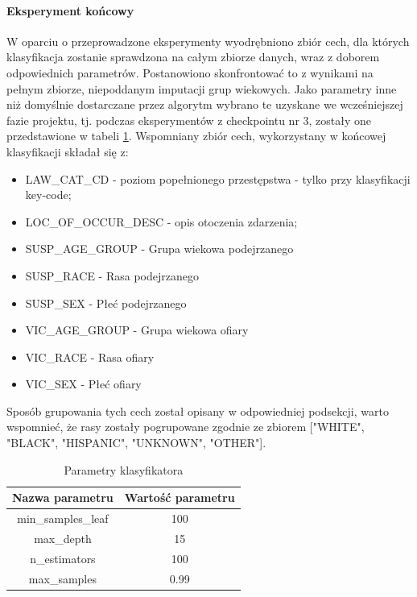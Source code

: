\documentclass{classrep}
\begin{document}
{{{                \paragraph{Eksperyment końcowy} {
                    W oparciu o przeprowadzone eksperymenty wyodrębniono zbiór cech, dla których klasyfikacja zostanie sprawdzona na całym zbiorze danych, wraz z doborem odpowiednich parametrów. Postanowiono skonfrontować to z wynikami na pełnym zbiorze, niepoddanym imputacji grup wiekowych. Jako parametry inne niż domyślnie dostarczane przez algorytm wybrano te uzyskane we wcześniejszej fazie projektu, tj. podczas eksperymentów z checkpointu nr 3, zostały one przedstawione w tabeli \ref{goal_1_exp_final_params}.
                    Wspomniany zbiór cech, wykorzystany w końcowej klasyfikacji składał się z: 
                    \begin{itemize}
                        \item LAW\_CAT\_CD - poziom popełnionego przestępstwa - tylko przy klasyfikacji key-code;
                        \item LOC\_OF\_OCCUR\_DESC - opis otoczenia zdarzenia;
                        \item SUSP\_AGE\_GROUP - Grupa wiekowa podejrzanego
                        \item SUSP\_RACE - Rasa podejrzanego
                        \item SUSP\_SEX - Płeć podejrzanego
                        \item VIC\_AGE\_GROUP - Grupa wiekowa ofiary
                        \item VIC\_RACE - Rasa ofiary
                        \item VIC\_SEX - Płeć ofiary
                    \end{itemize}
                    Sposób grupowania tych cech został opisany w odpowiedniej podsekcji, warto wspomnieć, że rasy zostały pogrupowane zgodnie ze zbiorem ["WHITE", "BLACK", "HISPANIC", "UNKNOWN", "OTHER"].
                    
                    \begin{table}
                    \small
                    \centering
                    \begin{tabular}{|c|c|}
                    \hline
                    Nazwa parametru & Wartość parametru \\ \hline
                        min\_samples\_leaf & 100\\ \hline
                        max\_depth & 15 \\ \hline
                        n\_estimators & 100 \\ \hline
                        max\_samples & 0.99  \\ \hline
                        \end{tabular}
                        \caption{Parametry klasyfikatora}
                        \label{goal_1_exp_final_params}
                     \end{table}

}}}}
\end{document}
